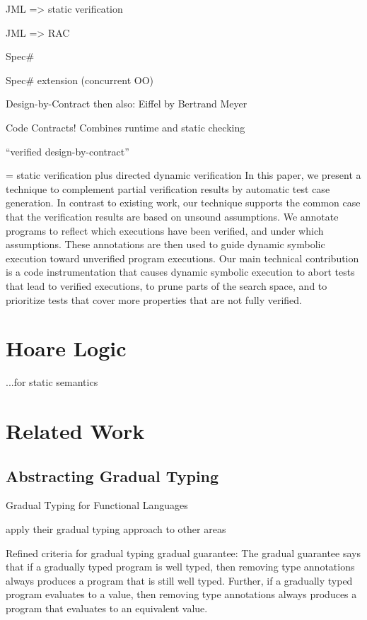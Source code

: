 \cite{jacobs2001logic} JML => static verification

\cite{cheon2002runtime} JML => RAC

\cite{the-spec-programming-system-an-overview} Spec\#

\cite{a-statically-verifiable-programming-model-for-concurrent-object-oriented-programs} Spec\# extension (concurrent OO)

\cite{meyer2002design} Design-by-Contract
then also: Eiffel by Bertrand Meyer 

\cite{embedded-contract-languages} Code Contracts! Combines runtime and static checking

\cite{crocker2004safe} “verified design-by-contract”

\cite{ChristakisMuellerWuestholz16}
= static verification plus directed dynamic verification
In this paper, we present a technique to complement partial
verification results by automatic test case generation. In
contrast to existing work, our technique supports the common
case that the verification results are based on unsound
assumptions. We annotate programs to reflect which executions
have been verified, and under which assumptions.
These annotations are then used to guide dynamic symbolic
execution toward unverified program executions. Our main
technical contribution is a code instrumentation that causes
dynamic symbolic execution to abort tests that lead to verified
executions, to prune parts of the search space, and to
prioritize tests that cover more properties that are not fully
verified.

\section{Hoare Logic}
...for static semantics

\cite{hoare1969axiomatic}

\section{Related Work}
\subsection{Abstracting Gradual Typing}
\cite{siek2006gradual}
Gradual Typing for Functional Languages

apply their gradual typing approach to other areas

\cite{siek2015refined}
Refined criteria for gradual typing
gradual guarantee:
     The gradual guarantee says that if a gradually typed program is
     well typed, then removing type annotations always produces a program that is still well typed.
     Further, if a gradually typed program evaluates to a value, then removing type annotations
     always produces a program that evaluates to an equivalent value.

